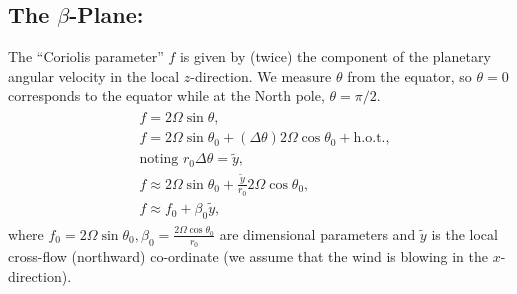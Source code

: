 \documentclass{article}
\begin{document}
\subsection{The $\beta$-Plane:}
The ``Coriolis parameter'' $f$ is given by (twice) the component of the planetary angular velocity in the local $z$-direction. We measure $\theta$ from the equator, so $\theta=0$ corresponds to the equator while at the North pole, $\theta=\pi/2$. 
\begin{align}\label{eq:beta-plane-approx}
 \begin{split}
  & f = 2\Omega \sin{\theta},\\
  & f = 2\Omega \sin{\theta_{0}} + (\Delta \theta) 2\Omega \cos{\theta_{0}} + \textrm{h.o.t.},\\
  &\textrm{noting } r_{0} \Delta \theta = \tilde{y},\\
  & f \approx 2\Omega \sin{\theta_{0}} + \frac{\tilde{y}}{r_{0}} 2\Omega \cos{\theta_{0}},\\
  & \boxed{ f \approx f_{0} + \beta_{0} \tilde{y}},
 \end{split}
\end{align}
where $f_{0} = 2\Omega \sin{\theta_{0}}, \beta_{0} = \frac{2\Omega \cos{\theta_{0}}}{r_{0}}$ are dimensional parameters and $\tilde{y}$ is the local cross-flow (northward) co-ordinate (we assume that the wind is blowing in the $x$-direction).  
\end{document}
